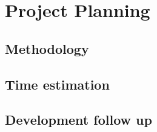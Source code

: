 \chapter{Project Planning}

\section{Methodology}


\section{Time estimation}

\section{Development follow up}
